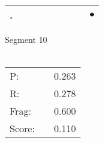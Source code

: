 \documentclass[landscape]{article}
\newcommand{\ssp}{\hspace{2pt}}
\newcommand{\mex}{\cellcolor{g}$\bullet$}
\begin{document}
\begin{tabular}{|l|p{10pt}|p{10pt}|p{10pt}|p{10pt}|p{10pt}|p{10pt}|p{10pt}|p{10pt}|}
\hline
\ssp \cellcolor{ref7}. \ssp&\hspace{2pt}&\hspace{2pt}&\hspace{2pt}&\hspace{2pt}&\hspace{2pt}&\hspace{2pt}&\hspace{2pt}&\hspace{2pt}\mex\\
\hline
\end{tabular}

\vspace{6pt}
\noindent Segment 10\\\\
\noindent\begin{tabular}{lm{12pt}r}
\hline
P:&&0.263\\
R:&&0.278\\
Frag:&&0.600\\
Score:&&0.110\\
\end{tabular}

\newpage
\end{document}
